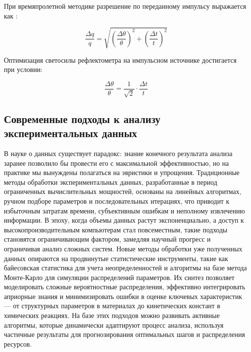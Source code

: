 \documentclass[a4paper]{article}
\begin{document}
При времяпролетной методике разрешение по переданному импульсу выражается как \cite{15}:

\begin{equation}
\frac{\Delta q}{q} = \sqrt{\left(\frac{\Delta\theta}{\theta}\right)^2 + \left(\frac{\Delta t}{t}\right)^2}
\end{equation}

Оптимизация светосилы рефлектометра на импульсном источнике достигается при условии:

\begin{equation}
\frac{\Delta\theta}{\theta} = \frac{1}{\sqrt{2}} \cdot \frac{\Delta t}{t}
\end{equation}

\subsection{Современные подходы к анализу экспериментальных данных}
В науке о данных существует парадокс: знание конечного результата анализа заранее позволило бы провести его с максимальной эффективностью, но на практике мы вынуждены полагаться на эвристики и упрощения. Традиционные методы обработки экспериментальных данных, разработанные в период ограниченных вычислительных мощностей, основаны на линейных алгоритмах, ручном подборе параметров и последовательных итерациях, что приводит к избыточным затратам времени, субъективным ошибкам и неполному извлечению информации. В эпоху, когда объемы данных растут экспоненциально, а доступ к высокопроизводительным компьютерам стал повсеместным, такие подходы становятся ограничивающим фактором, замедляя научный прогресс и ограничивая анализ сложных систем.
Новые методы обработки уже полученных данных опираются на продвинутые статистические инструменты, такие как байесовская статистика для учета неопределенностей и алгоритмы на базе метода Монте-Карло для симуляции распределений параметров. Их синтез позволяет моделировать сложные вероятностные распределения, эффективно интегрировать априорные знания и минимизировать ошибки в оценке ключевых характеристик — от структурных параметров в материалах до кинетических констант в химических реакциях. На базе этих подходов можно развивать активные алгоритмы, которые динамически адаптируют процесс анализа, используя частичные результаты для прогнозирования оптимальных шагов и распределения ресурсов. 
\end{document}
